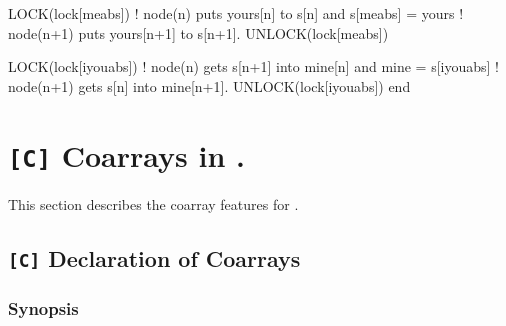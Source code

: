 \begin{itemize}
\begin{XFexample}
      LOCK(lock[meabs])   ! node(n) puts yours[n] to s[n] and 
      s[meabs] = yours    ! node(n+1) puts yours[n+1] to s[n+1].
      UNLOCK(lock[meabs])

      LOCK(lock[iyouabs])  ! node(n) gets s[n+1] into mine[n] and 
      mine = s[iyouabs]    ! node(n+1) gets s[n] into mine[n+1].
      UNLOCK(lock[iyouabs])
      end
\end{XFexample}

\end{itemize}

%
%
%

\section{{\tt [C]} Coarrays in {\XMPC}.}

This section describes the coarray features for {\XMPC}.

\subsection{{\tt [C]} Declaration of Coarrays}

\subsubsection*{Synopsis}

